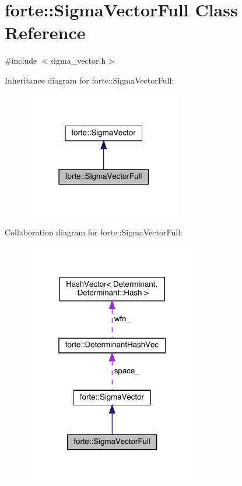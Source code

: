 \hypertarget{classforte_1_1_sigma_vector_full}{}\section{forte\+:\+:Sigma\+Vector\+Full Class Reference}
\label{classforte_1_1_sigma_vector_full}


{\ttfamily \#include $<$sigma\+\_\+vector.\+h$>$}



Inheritance diagram for forte\+:\+:Sigma\+Vector\+Full\+:
\nopagebreak
\begin{figure}[H]
\begin{center}
\leavevmode
\includegraphics[width=195pt]{classforte_1_1_sigma_vector_full__inherit__graph}
\end{center}
\end{figure}


Collaboration diagram for forte\+:\+:Sigma\+Vector\+Full\+:
\nopagebreak
\begin{figure}[H]
\begin{center}
\leavevmode
\includegraphics[width=217pt]{classforte_1_1_sigma_vector_full__coll__graph}
\end{center}
\end{figure}
